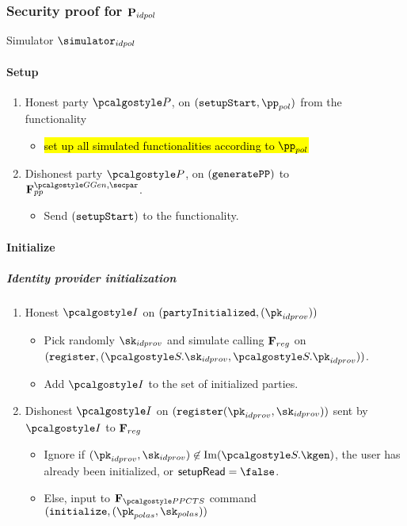 \documentclass[runningheads,10pt]{llncs}
\numberwithin{equation}{section}
\begin{document}
\subsubsection{Security proof for $\mathbf{P}_{idpol}$}
\begin{simbox}{Simulator $\simulator_{idpol}$}
  \paragraph{Setup}
  \begin{enumerate}
  \item Honest party $\party$, on $(\setupStart, \pp_{pol})$ from the
  functionality
    \begin{itemize}
    \item \hl{set up all simulated functionalities according to $\pp_{pol}$}
    \end{itemize}
  \item Dishonest party $\party$, on $(\mathtt{generatePP})$ to $\func{pp}^{\ggen,
  \secpar}$.
    \begin{itemize}
    \item Send $(\mathtt{setupStart})$ to the functionality.
    \end{itemize}
  \end{enumerate}

  \paragraph{Initialize}
  \subparagraph{Identity provider initialization}
  \begin{enumerate}
  \item Honest $\idprov$ on $(\partyInitialized, (\pk_{idprov}))$
    \begin{itemize}
    \item Pick randomly $\sk_{idprov}$ and simulate calling $\mathbf{F}_{{reg}}$ on
      $(\register, (\SIG.\sk_{idprov}, \SIG.\pk_{idprov}))$.
    \item Add $\idprov$ to the set of initialized parties.
    \end{itemize}
  \item Dishonest $\idprov$ on $(\register (\pk_{idprov}, \sk_{idprov}))$ sent by
    $\idprov$ to $\mathbf{F}_{{reg}}$
    \begin{itemize}
    \item Ignore if $(\pk_{idprov}, \sk_{idprov}) \not\in \IM (\SIG.\kgen)$, the user
      has already been initialized, or $\flag{setupRead} = \false$.
    \item Else, input to $\func{\PPCTS}$ command $(\initialize, (\pk_{polas}, \sk_{polas}))$
    \end{itemize}
  \end{enumerate}


\end{simbox}
\end{document}
